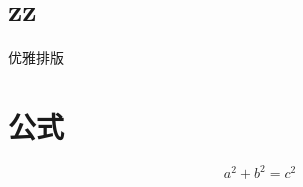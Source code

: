 \documentclass[UTF8]{ctexart}
\begin{document}
\section{zz}
优雅排版

\section{公式}
\[a^2 + b^2 = c^2\]
\end{document}
